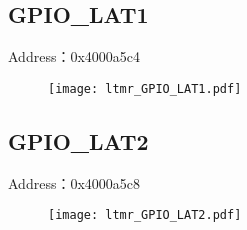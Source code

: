 \subsection{GPIO\_LAT1}
\label{ltmr-GPIO-LAT1}
Address：0x4000a5c4
 \begin{figure}[H]
\texttt{[image: ltmr\_GPIO\_LAT1.pdf]}
\end{figure}

\subsection{GPIO\_LAT2}
\label{ltmr-GPIO-LAT2}
Address：0x4000a5c8
 \begin{figure}[H]
\texttt{[image: ltmr\_GPIO\_LAT2.pdf]}
\end{figure}

